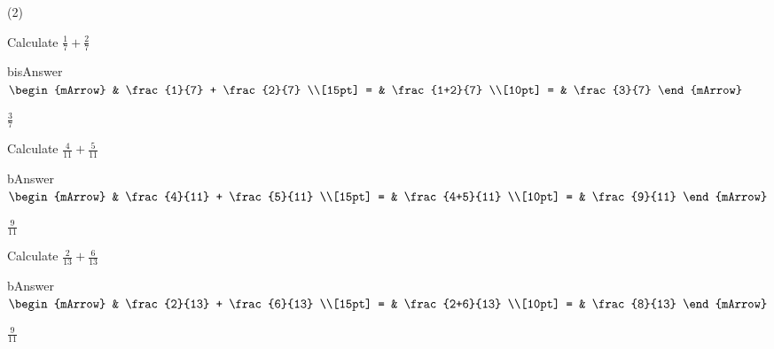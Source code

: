 \clearpage\noindent%
\begin{mtask}(2)
   \task \begin{exercise} Calculate $ \frac{1}{7} +  \frac{2}{7} $
           \begin{envOut}[height=6cm]{bisAnswer}
             $\begin{mArrow} 
			       & \frac{1}{7} +  \frac{2}{7}             \\[15pt]
                 = & \frac{1+2}{7}                          \\[10pt]
		   		 = & \frac{3}{7}
              \end{mArrow}$
            \begin{shortsolution}  
			     $\frac{3}{7}$
			\end{shortsolution}				 
           \end{envOut}
         \end{exercise}
		 
   \task \begin{exercise} Calculate $ \frac{4}{11} + \frac{5}{11} $
           \begin{envOut}[height=6cm]{bAnswer}
             $\begin{mArrow} 
			       & \frac{4}{11} +  \frac{5}{11}             \\[15pt]
                 = & \frac{4+5}{11}                          \\[10pt]
		   		 = & \frac{9}{11}
              \end{mArrow}$
            \begin{shortsolution}  
			     $\frac{9}{11}$
			\end{shortsolution}				 
           \end{envOut}
         \end{exercise}

   \task \begin{exercise} Calculate $ \frac{2}{13} + \frac{6}{13} $
           \begin{envOut}[height=6cm]{bAnswer}
             $\begin{mArrow} 
			       & \frac{2}{13} +  \frac{6}{13}             \\[15pt]
                 = & \frac{2+6}{13}                          \\[10pt]
		   		 = & \frac{8}{13}
              \end{mArrow}$
            \begin{shortsolution}  
			     $\frac{9}{11}$
			\end{shortsolution}				 
           \end{envOut}
         \end{exercise}


\end{mtask}
